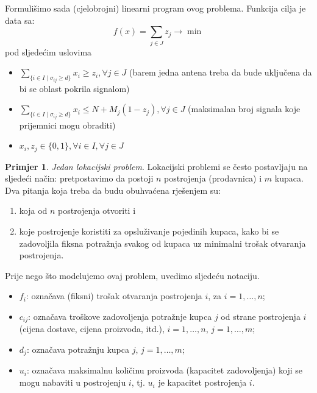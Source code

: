 \documentclass[a4paper, utf8, 11pt, colorlinks]{book}
\theoremstyle{definition}
\newtheorem{primjer}{Primjer}[chapter]
\begin{document}
Formulišimo sada (cjelobrojni) linearni program ovog problema. 
Funkcija cilja je data sa:
$$ f(x) = \sum_{j \in J} z_j \rightarrow \min $$
pod sljedećim uslovima 
\begin{itemize}
	\item  $ \sum_{\{i \in I \mid \sigma_{ij} \geq d \}} x_i \geq z_i, \forall j \in J $ (barem jedna antena treba da bude uključena da bi se oblast pokrila signalom)
	\item $ \sum_{\{i \in I \mid \sigma_{ij} \geq d \}} x_i  \leq N + M_j( 1 - z_j), \forall j \in J $ (maksimalan broj signala koje prijemnici mogu obraditi)  
	\item $x_i, z_j \in\{0, 1\}, \forall i \in I, \forall j \in J$
\end{itemize}
\begin{primjer}
\emph{Jedan lokacijski problem}. Lokacijski problemi se često postavljaju na sljedeći način: pretpostavimo da postoji $n$ postrojenja (prodavnica)  i  $m$ kupaca. Dva pitanja koja treba da budu obuhvaćena rješenjem su:
\begin{enumerate}
	\item koja od $n$ postrojenja otvoriti i
	\item koje  postrojenje koristiti za opsluživanje pojedinih kupaca, kako bi se zadovoljila fiksna potražnja svakog od kupaca uz minimalni trošak otvaranja postrojenja.
\end{enumerate}
Prije nego što modelujemo ovaj problem, uvedimo sljedeću notaciju.
\begin{itemize}
	\item  $f_{i}$: označava (fiksni) trošak otvaranja postrojenja $i$, za  $ i = 1,  \ldots, n$;
	\item $c_{ij}$: označava troškove zadovoljenja potražnje  kupca $j$ od strane postrojenja $i$ (cijena dostave, cijena proizvoda,  itd.), $i = 1, \ldots, n$, $j = 1,  \ldots, m$;
	\item $d_{j}$: označava potražnju kupca $j$, $j = 1, \ldots, m$;
	\item $u_{i}$: označava maksimalnu količinu proizvoda (kapacitet zadovoljenja) koji se mogu nabaviti u postrojenju $i$, tj. $u_{i}$ je kapacitet postrojenja $i$.
\end{itemize}


\end{primjer}
\end{document}
